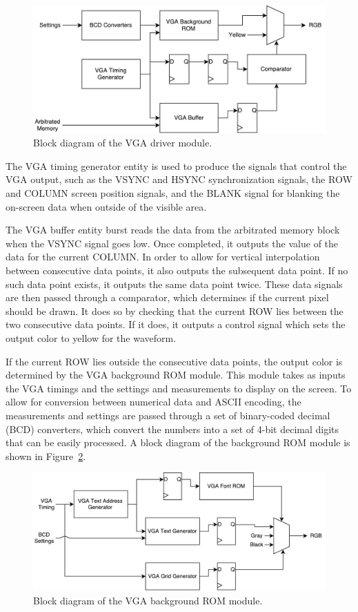 \documentclass[journal,hidelinks]{IEEEtran}
\begin{document}
\begin{figure}[!htb]
  \centering
  \includegraphics[width=\columnwidth]{diagrams/vga_driver.pdf}
  \caption{Block diagram of the VGA driver module.}
  \label{fig:vga_driver}
\end{figure}

The VGA timing generator entity is used to produce the signals that control the VGA output, such as the VSYNC and HSYNC synchronization signals, the ROW and COLUMN screen position signals, and the BLANK signal for blanking the on-screen data when outside of the visible area.

The VGA buffer entity burst reads the data from the arbitrated memory block when the VSYNC signal goes low. Once completed, it outputs the value of the data for the current COLUMN. In order to allow for vertical interpolation between consecutive data points, it also outputs the subsequent data point. If no such data point exists, it outputs the same data point twice.
These data signals are then passed through a comparator, which determines if the current pixel should be drawn. It does so by checking that the current ROW lies between the two consecutive data points. If it does, it outputs a control signal which sets the output color to yellow for the waveform.

If the current ROW lies outside the consecutive data points, the output color is determined by the VGA background ROM module. This module takes as inputs the VGA timings and the settings and measurements to display on the screen. To allow for conversion between numerical data and ASCII encoding, the measurements and settings are passed through a set of binary-coded decimal (BCD) converters, which convert the numbers into a set of 4-bit decimal digits that can be easily processed. A block diagram of the background ROM module is shown in Figure~\ref{fig:vga_rom}.

\begin{figure}[!htb]
  \centering
  \includegraphics[width=\columnwidth]{diagrams/vga_rom.pdf}
  \caption{Block diagram of the VGA background ROM module.}
  \label{fig:vga_rom}
\end{figure}
\end{document}
